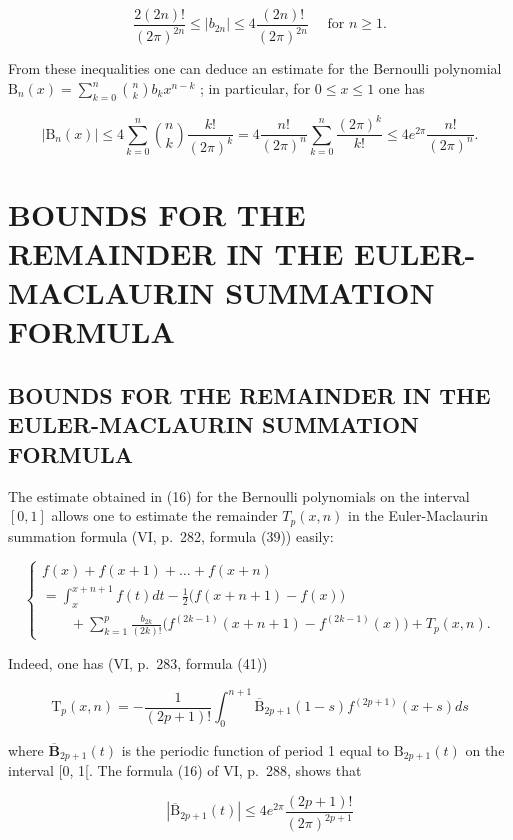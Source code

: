 \[
\frac {2 (2 n) !}{(2 \pi) ^ {2 n}} \leqslant | b _ {2 n} | \leqslant 4 \frac {(2 n) !}{(2 \pi) ^ {2 n}} \quad \text {   for   } n \geqslant 1.\tag{15}
\]

From these inequalities one can deduce an estimate for the Bernoulli polynomial \(\mathrm{B}_n(x) = \sum_{k=0}^{n}\binom{n}{k}b_kx^{n - k}\) ; in particular, for \(0 \leqslant x \leqslant 1\) one has

\[
\left| \mathrm{B} _ {n} (x) \right| \leqslant 4 \sum_ {k = 0} ^ {n} \binom {n} {k} \frac {k !}{(2 \pi) ^ {k}} = 4 \frac {n !}{(2 \pi) ^ {n}} \sum_ {k = 0} ^ {n} \frac {(2 \pi) ^ {k}}{k !} \leqslant 4 e ^ {2 \pi} \frac {n !}{(2 \pi) ^ {n}}.\tag{16}
\]

\section{BOUNDS FOR THE REMAINDER IN THE EULER-MACLAURIN SUMMATION FORMULA}

\subsection{BOUNDS FOR THE REMAINDER IN THE EULER-MACLAURIN SUMMATION FORMULA}

The estimate obtained in (16) for the Bernoulli polynomials on the interval \([0, 1]\) allows one to estimate the remainder \(T_{p}(x, n)\) in the Euler-Maclaurin summation formula (VI, p.~282, formula (39)) easily:

\[
\left\{ \begin{array}{l} f (x) + f (x + 1) + \dots + f (x + n) \\ = \int_ {x} ^ {x + n + 1} f (t) d t - \frac {1}{2} \bigl (f (x + n + 1) - f (x) \bigr) \\ \qquad + \sum_ {k = 1} ^ {p} \frac {b _ {2 k}}{(2 k) !} \bigl (f ^ {(2 k - 1)} (x + n + 1) - f ^ {(2 k - 1)} (x) \bigr) + T _ {p} (x, n). \end{array} \right.\tag{1}
\]

Indeed, one has (VI, p.~283, formula (41))

\[
\mathrm{T} _ {p} (x, n) = - \frac {1}{(2 p + 1) !} \int_ {0} ^ {n + 1} \overline {{\mathrm{B}}} _ {2 p + 1} (1 - s) f ^ {(2 p + 1)} (x + s) d s\tag{2}
\]

where \(\overline{\mathbf{B}}_{2p + 1}(t)\) is the periodic function of period 1 equal to \(\mathrm{B}_{2p + 1}(t)\) on the interval {[}0, 1{[}. The formula (16) of VI, p.~288, shows that

\[
\left| \overline {{{{\mathrm{B}}}}} _ {2 p + 1} (t) \right| \leqslant 4 e ^ {2 \pi} \frac {(2 p + 1) !}{(2 \pi) ^ {2 p + 1}}\tag{3}
\]

